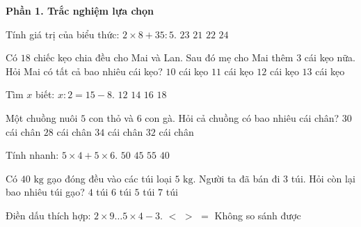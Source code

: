 \textbf{Phần 1. Trắc nghiệm lựa chọn}

\begin{ex} %
Tính giá trị của biểu thức: $2 \times 8 + 35 : 5$.
\choice
{\True $23$}
{$21$}
{$22$}
{$24$}
\end{ex}

\begin{ex} %
Có $18$ chiếc kẹo chia đều cho Mai và Lan. Sau đó mẹ cho Mai thêm $3$ cái kẹo nữa. Hỏi Mai có tất cả bao nhiêu cái kẹo?
\choice
{$10$ cái kẹo}
{$11$ cái kẹo}
{\True $12$ cái kẹo}
{$13$ cái kẹo}
\end{ex}

\begin{ex} %
Tìm $x$ biết: $x : 2 = 15 - 8$.
\choice
{$12$}
{\True $14$}
{$16$}
{$18$}
\end{ex}

\begin{ex} %
Một chuồng nuôi $5$ con thỏ và $6$ con gà. Hỏi cả chuồng có bao nhiêu cái chân?
\choice
{$30$ cái chân}
{$28$ cái chân}
{$34$ cái chân}
{\True $32$ cái chân}
\end{ex}

\begin{ex} %
Tính nhanh: $5 \times 4 + 5 \times 6$.
\choice
{\True $50$}
{$45$}
{$55$}
{$40$}
\end{ex}

\begin{ex} %
Có $40\text{ kg}$ gạo đóng đều vào các túi loại $5\text{ kg}$. Người ta đã bán đi $3$ túi. Hỏi còn lại bao nhiêu túi gạo?
\choice
{$4$ túi}
{$6$ túi}
{\True $5$ túi}
{$7$ túi}
\end{ex}

\begin{ex} %
Điền dấu thích hợp: $2 \times 9 \dots 5 \times 4 - 3$.
\choice
{$<$}
{\True $>$}
{$=$}
{Không so sánh được}
\end{ex}

